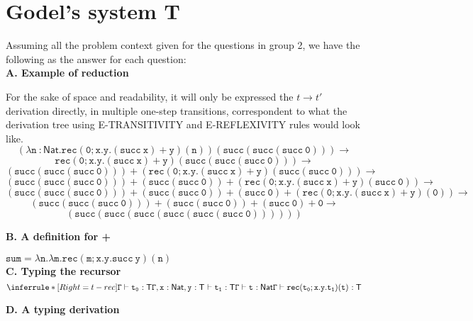 \documentclass[a4paper]{article}
\begin{document}
\section{Godel’s system T}

Assuming all the problem context given for the questions in group 2, we have the following as the answer for each question:\\
%

\textbf{A. Example of reduction}

For the sake of space and readability, it will only be expressed the $t \rightarrow t'$ derivation directly, in multiple one-step transitions, correspondent to what the derivation tree using E-TRANSITIVITY and E-REFLEXIVITY rules would look like.
$${(\mathtt{\lambda n}~\mathsf{:Nat.}\mathtt{rec(0;x.y.(succ \ x) + y)(n)}) \mathtt{(succ(succ(succ \ 0)))}}\rightarrow$$
$$\mathtt{rec(0;x.y.(succ \ x) + y)(succ(succ(succ \ 0)))}\rightarrow$$
$$\mathtt{(succ(succ(succ \ 0))) + (rec(0;x.y.(succ \ x) + y)(succ(succ \ 0)))}\rightarrow$$
$$\mathtt{(succ(succ(succ \ 0))) + (succ(succ \ 0)) + (rec(0;x.y.(succ \ x) + y)(succ \ 0))}\rightarrow$$
$$\mathtt{(succ(succ(succ \ 0))) + (succ(succ \ 0)) + (succ \ 0) + (rec(0;x.y.(succ \ x) + y)(0))}\rightarrow$$
$$\mathtt{(succ(succ(succ \ 0))) + (succ(succ \ 0)) + (succ \ 0) + 0}\rightarrow$$
$$\mathtt{(succ(succ(succ(succ(succ(succ \ 0))))))}$$

\textbf{B. A definition for +}

$\mathtt{sum = \lambda n.\lambda m. rec(m;x.y.succ \ y)(n)}$\\

\textbf{C. Typing the recursor}
\[
\inferrule*[Right=t-rec]
	{
		{\mathtt{\Gamma \vdash t_0}~\mathsf{:T}} \\
		{\mathtt{\Gamma,x}~\mathsf{:Nat}\mathtt{,y}~\mathsf{:T}\mathtt{\ \vdash t_1}~\mathsf{:T}} \\
		{\mathtt{\Gamma \vdash t}~\mathsf{:Nat}}
	}
	{\mathtt{\Gamma \vdash rec(t_0;x.y.t_1)(t)}~\mathsf{:T}}
\]

\textbf{D. A typing derivation}
\end{document}
